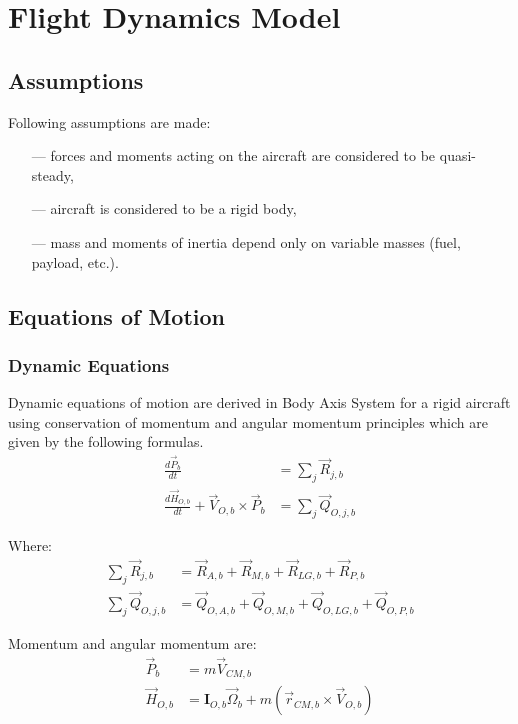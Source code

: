 \chapter{Flight Dynamics Model}

\section{Assumptions}

Following assumptions are made:
\begin{itemize}
  \item[---] forces and moments acting on the aircraft are considered to be quasi-steady,
  \item[---] aircraft is considered to be a rigid body,
  \item[---] mass and moments of inertia depend only on variable masses (fuel, payload, etc.).
\end{itemize}

\section{Equations of Motion}

\subsection{Dynamic Equations}

Dynamic equations of motion are derived in Body Axis System for a rigid aircraft using conservation of momentum and angular momentum principles which are given by the following formulas. \cite{Taylor2005, Osinski1997, Leyko2002}
\begin{align}
  \label{eq-fdm-mom-deriv-1}
  \frac{d {\vec P}_b}{dt}
  &=
  \sum_{j} {\vec R}_{j,b} \\
  \label{eq-fdm-ang-mom-deriv-1}
  \frac{d {\vec H}_{O,b}}{dt} + {\vec V}_{O,b} \times {\vec P}_b
  &=
  \sum_{j} {\vec Q}_{O,j,b}
\end{align}

Where:
\begin{align}
  \sum_{j} {\vec R}_{j,b}
  &=
  {\vec R}_{A,b} + {\vec R}_{M,b} + {\vec R}_{LG,b} + {\vec R}_{P,b} \\
  \sum_{j} {\vec Q}_{O,j,b}
  &=
  {\vec Q}_{O,A,b} + {\vec Q}_{O,M,b} + {\vec Q}_{O,LG,b} + {\vec Q}_{O,P,b}
\end{align}

Momentum and angular momentum are: \cite{Osinski1997, Leyko2002}
\begin{align}
  \label{eq-fdm-mom-1} 
  {\vec P}_b
  &=
  m {\vec V}_{CM,b} \\
  \label{eq-fdm-ang-mom-1}
  {\vec H}_{O,b}
  &=
  {\boldsymbol I}_{O,b} {\vec \Omega}_b
  +
  m \left( {\vec r}_{CM,b}
  \times
  {\vec V}_{O,b} \right)
\end{align}

